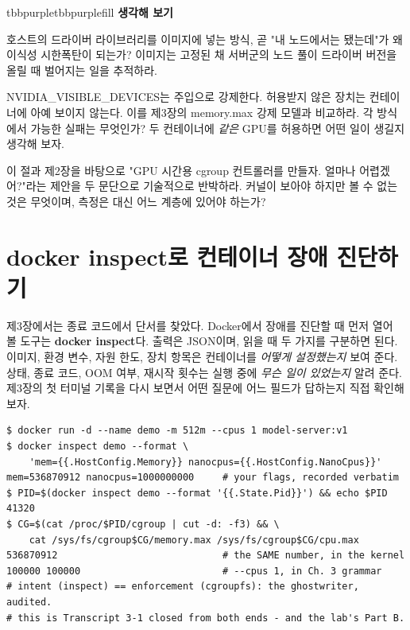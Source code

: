 \begin{calloutbox}{tbbpurple}{tbbpurplefill}
{\normalsize\bfseries\color{tbbpurple}생각해 보기}\par\vspace{3pt}
\begin{tbbitemize}
  \item 호스트의 드라이버 라이브러리를 이미지에 넣는 방식, 곧 "내 노드에서는 됐는데"가 왜 이식성 시한폭탄이 되는가? 이미지는 고정된 채 서버군의 노드 풀이 드라이버 버전을 올릴 때 벌어지는 일을 추적하라.
  \item NVIDIA\_VISIBLE\_DEVICES는 주입으로 강제한다. 허용받지 않은 장치는 컨테이너에 아예 보이지 않는다. 이를 제3장의 memory.max 강제 모델과 비교하라. 각 방식에서 가능한 실패는 무엇인가? 두 컨테이너에 \textit{같은} GPU를 허용하면 어떤 일이 생길지 생각해 보자.
  \item 이 절과 제2장을 바탕으로 "GPU 시간용 cgroup 컨트롤러를 만들자. 얼마나 어렵겠어?"라는 제안을 두 문단으로 기술적으로 반박하라. 커널이 보아야 하지만 볼 수 없는 것은 무엇이며, 측정은 대신 어느 계층에 있어야 하는가?
\end{tbbitemize}
\end{calloutbox}

\section{docker inspect로 컨테이너 장애 진단하기}

제3장에서는 종료 코드에서 단서를 찾았다. Docker에서 장애를 진단할 때 먼저 열어 볼 도구는 \textbf{docker inspect}다. 출력은 JSON이며, 읽을 때 두 가지를 구분하면 된다. 이미지, 환경 변수, 자원 한도, 장치 항목은 컨테이너를 \textit{어떻게 설정했는지} 보여 준다. 상태, 종료 코드, OOM 여부, 재시작 횟수는 실행 중에 \textit{무슨 일이 있었는지} 알려 준다. 제3장의 첫 터미널 기록을 다시 보면서 어떤 질문에 어느 필드가 답하는지 직접 확인해 보자.

\begin{terminalbox}
\begin{Verbatim}[breaklines=true,breakanywhere=true,fontsize=\small,formatcom=\color{tbbtermfg},codes=\tbbcodeactive]
$ docker run -d --name demo -m 512m --cpus 1 model-server:v1
$ docker inspect demo --format \
    'mem={{.HostConfig.Memory}} nanocpus={{.HostConfig.NanoCpus}}'
mem=536870912 nanocpus=1000000000     # your flags, recorded verbatim
$ PID=$(docker inspect demo --format '{{.State.Pid}}') && echo $PID
41320
$ CG=$(cat /proc/$PID/cgroup | cut -d: -f3) && \
    cat /sys/fs/cgroup$CG/memory.max /sys/fs/cgroup$CG/cpu.max
536870912                             # the SAME number, in the kernel
100000 100000                         # --cpus 1, in Ch. 3 grammar
# intent (inspect) == enforcement (cgroupfs): the ghostwriter, audited.
# this is Transcript 3-1 closed from both ends - and the lab's Part B.
\end{Verbatim}
\end{terminalbox}

